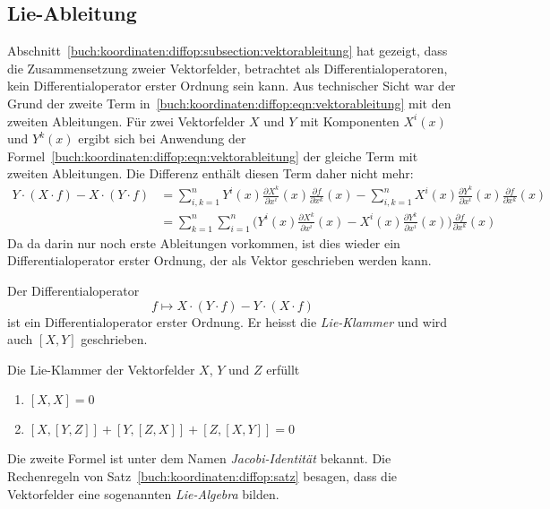%
%
\subsection{Lie-Ableitung}
Abschnitt~\ref{buch:koordinaten:diffop:subsection:vektorableitung}
hat gezeigt, dass die Zusammensetzung zweier Vektorfelder, betrachtet
als Differentialoperatoren, kein Differentialoperator erster Ordnung
sein kann.
Aus technischer Sicht war der Grund der zweite Term 
in~\eqref{buch:koordinaten:diffop:eqn:vektorableitung}
mit den zweiten Ableitungen.
Für zwei Vektorfelder $X$ und $Y$ mit Komponenten $X^i(x)$ und
$Y^k(x)$ ergibt sich bei Anwendung der
Formel~\eqref{buch:koordinaten:diffop:eqn:vektorableitung}
der gleiche Term mit zweiten Ableitungen.
Die Differenz enthält diesen Term daher nicht mehr:
\begin{align*}
Y\cdot(X\cdot f)
-
X\cdot(Y\cdot f)
&=
\sum_{i,k=1}^n
Y^i(x)\frac{\partial X^k}{\partial x^i}(x) \frac{\partial f}{\partial x^k}(x)
-
\sum_{i,k=1}^n
X^i(x)\frac{\partial Y^k}{\partial x^i}(x) \frac{\partial f}{\partial x^k}(x)
\\
&=
\sum_{k=1}^n
\sum_{i=1}^n
\biggl(
Y^i(x)\frac{\partial X^k}{\partial x^i}(x)
-
X^i(x)\frac{\partial Y^k}{\partial x^i}(x)
\biggr)
\frac{\partial f}{\partial x^k}(x)
\end{align*}
Da da darin nur noch erste Ableitungen vorkommen, ist dies wieder
ein Differentialoperator erster Ordnung, der als Vektor
geschrieben werden kann.

\begin{definition}
\label{buch:koordinaten:diffop:def:lieableitung}
Der Differentialoperator 
\[
f\mapsto
X\cdot(Y\cdot f)
-
Y\cdot(X\cdot f)
\]
ist ein Differentialoperator erster Ordnung.
Er heisst die {\em Lie-Klammer} und wird auch $[X,Y]$
geschrieben.
\end{definition}

\begin{satz}
\label{buch:koordinaten:diffop:satz}
Die Lie-Klammer der Vektorfelder $X$, $Y$ und $Z$ erfüllt
\begin{enumerate}
\item $[X,X]=0$
\item $[X, [Y, Z]] + [Y, [Z, X]] + [Z, [X, Y]] = 0$
\end{enumerate}
\end{satz}

Die zweite Formel ist unter dem Namen {\em Jacobi-Identität} bekannt.
Die Rechenregeln von Satz~\ref{buch:koordinaten:diffop:satz} besagen,
dass die Vektorfelder eine sogenannten {\em Lie-Algebra} bilden.

